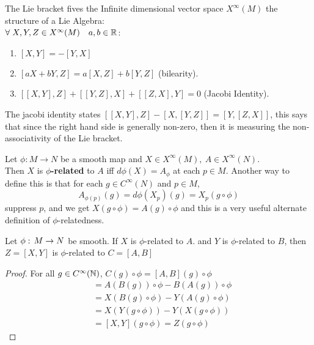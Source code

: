 \begin{teorema}
The Lie bracket fives the Infinite dimensional vector space $X^\infty(M)$ the structure of a Lie Algebra:\\
$\forall \; X,Y,Z \in X^\infty(M)\quad a,b\in \mathbb{R}$:
\begin{enumerate}[1)]
\item $[X,Y]= - [Y,X]$
\item $[aX+bY,Z] = a[X,Z] + b[Y,Z]$ (bilearity).
\item $[[X,Y],Z] + [[Y,Z],X] + [[Z,X],Y] = 0$ (Jacobi Identity).
\end{enumerate}
\end{teorema}

\begin{remarks}
The jacobi identity states $[[X,Y],Z] - [X,[Y,Z]] = [Y,[Z,X]]$, this says that since the right hand side is generally non-zero, then it is measuring the non-associativity of the Lie bracket.
\end{remarks}

\begin{ddef}
Let $\phi: M\to N$ be a smooth map  and $X\in X^\infty(M),\ A\in X^\infty(N)$.\\
Then $X$ is \textbf{$\phi$-related} to $A$ iff $d\phi(X) = A_\phi$ at each $p\in M$.  Another way to define this is that for each $g\in C^\infty(N)$ and $p\in M$,
$$A_{\phi(p)} (g) = d\phi (X_p) (g) = X_p(g\circ \phi) $$
suppress $p$, and we get $X(g\circ \phi) = A(g)\circ \phi$ and this is a very useful alternate definition of $\phi$-relatedness.
\end{ddef}

\begin{teorema}
Let $\phi:\, M\to N$ be smooth. If $X$ is $\phi$-related to $A$. and $Y$ is $\phi$-related to $B$, then $Z=[X,Y]$ is $\phi$-related to $C= [A,B]$
\begin{proof}
For all $g\in C^\infty(\mathbb{N})$, $C(g)\circ \phi = [A,B](g)\circ \phi$
\begin{align*}
&= A(B(g))\circ\phi - B(A(g)) \circ \phi \\
&= X(B(g)\circ\phi) - Y(A(g)\circ\phi)\\
&= X(Y(g\circ\phi)) - Y(X(g\circ\phi))\\
&= [X,Y](g\circ\phi) = Z(g\circ\phi)
\end{align*}
\end{proof}
\end{teorema}

